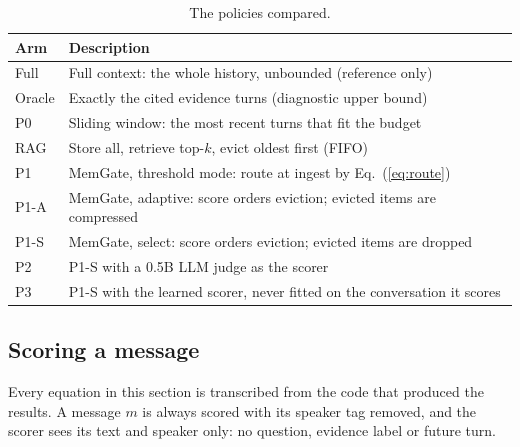 \begin{table}[htbp]
\caption{The policies compared.}
\label{tab:policies}
\centering
\fontsize{10}{12}\selectfont
\begin{tabularx}{\textwidth}{@{}p{1.6cm}X@{}}
\toprule
\textbf{Arm} & \textbf{Description} \\
\midrule
Full & Full context: the whole history, unbounded (reference only) \\
Oracle & Exactly the cited evidence turns (diagnostic upper bound) \\
P0 & Sliding window: the most recent turns that fit the budget \\
RAG & Store all, retrieve top-$k$, evict oldest first (FIFO) \\
P1 & MemGate, threshold mode: route at ingest by Eq.~(\ref{eq:route}) \\
P1-A & MemGate, adaptive: score orders eviction; evicted items are compressed \\
P1-S & MemGate, select: score orders eviction; evicted items are dropped \\
P2 & P1-S with a 0.5B LLM judge as the scorer \\
P3 & P1-S with the learned scorer, never fitted on the conversation it scores \\
\bottomrule
\end{tabularx}
\end{table}

\subsection{Scoring a message}
\label{sec:equations}

Every equation in this section is transcribed from the code that produced the
results. A message $m$ is always scored with its speaker tag removed, and the
scorer sees its text and speaker only: no question, evidence label or future
turn.

